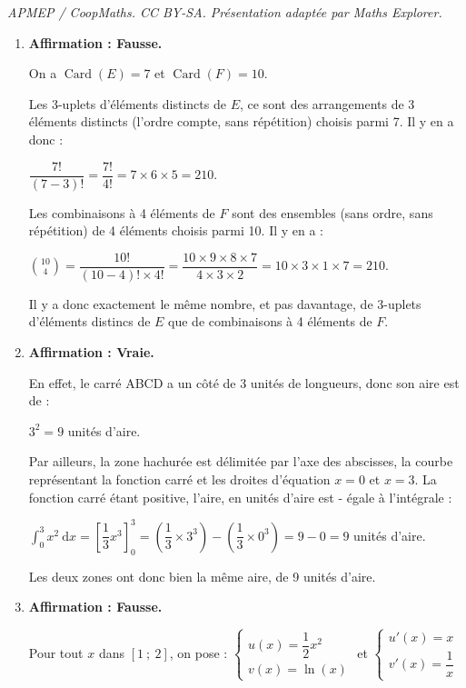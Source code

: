 \documentclass[10pt]{article}
\begin{document}
\noindent\textit{APMEP / CoopMaths. CC BY-SA. Présentation adaptée par Maths Explorer.}\par\medskip
\begin{enumerate}
	\item \textbf{Affirmation \theenumi : Fausse.}

	On a $\operatorname{Card}(E) = 7$ et $\operatorname{Card}(F) = 10$.

	Les 3-uplets d'éléments distincts de $E$, ce sont des arrangements de 3 éléments distincts (l'ordre compte, sans répétition) choisis parmi 7. Il y en a donc :

	$\dfrac{7 !}{(7 - 3)!} = \dfrac{7!}{4!} = 7 \times 6 \times 5 = 210$.

	Les combinaisons à 4 éléments de $F$ sont des ensembles (sans ordre, sans répétition) de 4 éléments choisis parmi 10. Il y en a :

	$\displaystyle \binom{10}{4} = \dfrac{10!}{(10-4)! \times 4!} = \dfrac{10 \times 9 \times 8 \times 7}{4 \times 3 \times 2} = 10 \times 3 \times 1 \times 7 = 210$.

	Il y a donc exactement le même nombre, et pas davantage, de 3-uplets d'éléments distincs de $E$ que de combinaisons à 4 éléments de $F$.

	\item \textbf{Affirmation \theenumi : Vraie.}

	En effet, le carré ABCD a un côté de 3 unités de longueurs, donc son aire est de :

	$3^2 = 9$ unités d'aire.

	Par ailleurs, la zone hachurée est délimitée par l'axe des abscisses, la courbe représentant la fonction carré et les droites d'équation $x = 0$ et $x=3$. La fonction carré étant positive, l'aire, en unités d'aire est - égale à l'intégrale :

$\displaystyle \int_{0}^{3} x^2 ~\mathrm{d} x = \left[\dfrac{1}{3}x^3\right]_0^3 = \left(\dfrac{1}{3}\times 3^3\right) - \left(\dfrac{1}{3}\times 0^3\right) = 9 - 0 = 9$ unités d'aire.

Les deux zones ont donc bien la même aire, de 9 unités d'aire.

	\item \textbf{Affirmation \theenumi : Fausse.}

Pour tout $x$ dans $[1~;~2]$, on pose :\quad
$\begin{cases}
u(x) = \dfrac{1}{2}x^2\\
v(x) = \ln(x)
\end{cases}$
\quad et \quad
$\begin{cases}
u'(x) = x\\
v'(x) = \dfrac{1}{x}
\end{cases}$


\end{enumerate}
\end{document}
